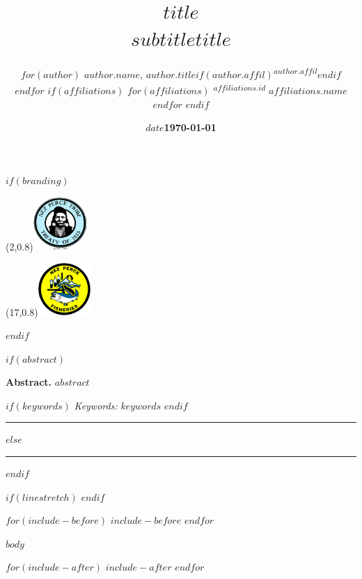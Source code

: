\documentclass[10pt,a4paper]{article}
\title{$title$ \\[1em] \large $subtitle$}
\title{$title$}
\author{}
\author{%
$for(author)$
\textbf{$author.name$}, \emph{$author.title$}$if(author.affil)$\textsuperscript{$author.affil$}$endif$\\[0.5em]
$endfor$
$if(affiliations)$
$for(affiliations)$
\textsuperscript{$affiliations.id$} $affiliations.name$\\
$endfor$
$endif$
}
\date{\textbf{$date$}}
\date{\textbf{\today}}
\newenvironment{abstractbox}
  {\begin{tcolorbox}[colback=gray!5!white,colframe=gray!50!black,
  width=\textwidth, boxrule=1.0pt, sharp corners, left=4pt, right=4pt, top=4pt, bottom=4pt]}
  {\end{tcolorbox}}
\begin{document}

\maketitle

$if(branding)$
  \vspace*{-1.5cm}
  \begin{textblock}{4}(2,0.8)\includegraphics[height=2.0cm]{../templates/NPT.png}\end{textblock}
  \begin{textblock}{4}(17,0.8)\includegraphics[height=2.0cm]{../templates/DFRM.png}\end{textblock}
$endif$


$if(abstract)$
  \vspace{3em}
  \begin{abstractbox}
  \textbf{Abstract.} $abstract$

  $if(keywords)$
    \vspace{1em}
    \textit{Keywords:} $keywords$
  $endif$
  \end{abstractbox}
  \vspace{0.5em}
  \rule{\linewidth}{0.2pt}
$else$
  \vspace{1em}
  \rule{\linewidth}{0.2pt}
$endif$

$if(linestretch)$
$endif$

$for(include-before)$
$include-before$
$endfor$

$body$

\printbibliography

$for(include-after)$
$include-after$
$endfor$
\end{document}
